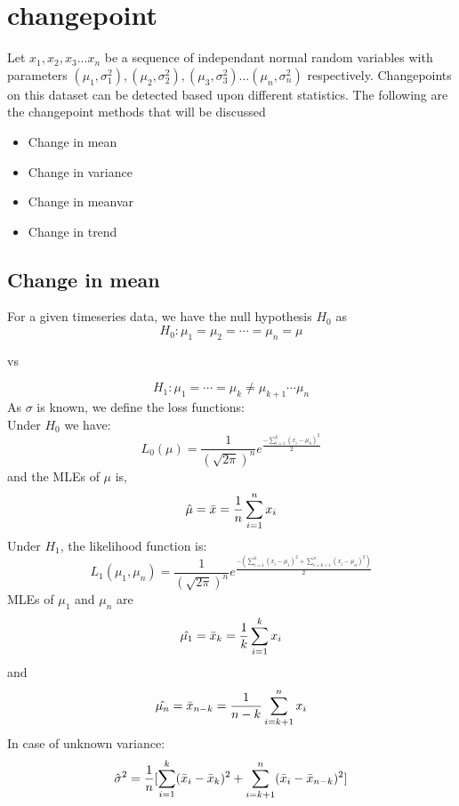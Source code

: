 \documentclass{article}
\begin{document}
\section{changepoint}
Let $x_{1},x_{2},x_{3}...x_{n}$ be a sequence of independant normal random variables with parameters $(\mu_{1},\sigma^{2}_{1}),(\mu_{2},\sigma^{2}_{2}),(\mu_{3},\sigma^{2}_{3})...(\mu_{n},\sigma^{2}_{n})$ respectively.
Changepoints on this dataset can be detected based upon different statistics. The following are the changepoint methods that will be discussed 
\begin{itemize}
    \item Change in mean
    \item Change in variance
    \item Change in meanvar
    \item Change in trend
\end{itemize}
\subsection{Change in mean}
For a given timeseries data, we have the null hypothesis $H_{0}$ as
$$H_{0} : \mu_{1} = \mu_{2} = \cdots = \mu_{n} = \mu$$
\begin{center}
    vs
\end{center}  
$$H_{1} : \mu_{1} = \cdots = \mu_{k} \neq \mu_{k+1} \cdots \mu_{n}$$
As $\sigma$ is known, we define the loss functions:\\
Under $H_{0}$ we have: \\
$$L_{0}(\mu) = \frac{1}{(\sqrt{2\pi})^{n}} e^{\frac{-\sum_{i=1}^{k} (x_{i} - \mu_{n})^{2}}{2}}$$
and the MLEs of $\mu$ is,
$$\hat{\mu} = \Bar{x} =\frac{1}{n} \sum_{i=1}^{n} x_{i}$$
Under $H_{1}$, the likelihood function is: \\
$$L_{1} (\mu_{1},\mu_{n}) = \frac{1}{(\sqrt{2\pi})^{n}} e^{\frac{-(\sum_{i=1}^{k} (x_{i} - \mu_{1})^{2} + \sum_{i=k+1}^{n} (x_{i} - \mu_{n})^{2})}{2}}$$
MLEs of $\mu_{1}$ and $\mu_{n}$ are
$$\hat{\mu_{1}} = \Bar{x}_{k} = \frac{1}{k}\sum_{i=1}^{k} x_{i}$$
and
$$\hat{\mu_{n}} = \Bar{x}_{n-k} = \frac{1}{n-k}\sum_{i=k+1}^{n}x_{i}$$
In case of unknown variance:
$$\hat{\sigma}^{2} = \frac{1}{n}[\sum_{i=1}^{k} (\Bar{x}_{i} - \Bar{x}_{k})^{2} + \sum_{i=k+1}^{n} (\Bar{x}_{i} - \Bar{x}_{n-k})^{2} ]$$
\end{document}
